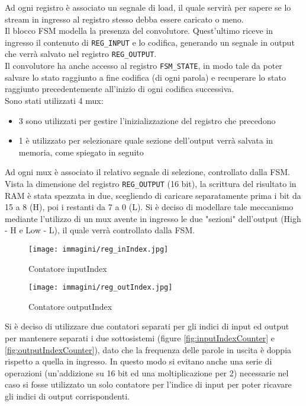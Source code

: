 \documentclass{article}
\begin{document}
Ad ogni registro è associato un segnale di load, il quale servirà per sapere se lo stream in ingresso al registro stesso debba essere caricato o meno.
\\
Il blocco FSM modella la presenza del convolutore. Quest'ultimo riceve in ingresso il contenuto di \texttt{REG\_INPUT} e lo codifica, generando un segnale in output che verrà salvato nel registro \texttt{REG\_OUTPUT}. 
\\
Il convolutore ha anche accesso al registro \texttt{FSM\_STATE}, in modo tale da poter salvare lo stato raggiunto a fine codifica (di ogni parola) e recuperare lo stato raggiunto precedentemente all'inizio di ogni codifica successiva.
\\
Sono stati utilizzati 4 mux: 
\begin{itemize}
    \item 3 sono utilizzati per gestire l'inizializzazione del registro che precedono
    \item 1 è utilizzato per selezionare quale sezione dell'output verrà salvata in memoria, come spiegato in seguito
\end{itemize}
Ad ogni mux è associato il relativo segnale di selezione, controllato dalla FSM.
\\
Vista la dimensione del registro \texttt{REG\_OUTPUT} (16 bit), la scrittura del risultato in RAM è stata spezzata in due, scegliendo di caricare separatamente prima i bit da 15 a 8 (H), poi i restanti da 7 a 0 (L). Si è deciso di modellare tale meccanismo mediante l'utilizzo di un mux avente in ingresso le due "sezioni" dell'output (High - H e Low - L), il quale verrà controllato dalla FSM.\\

\begin{figure}[h]
    \centering
    \begin{minipage}{0.53\textwidth}
        \centering
        \texttt{[image: immagini/reg\_inIndex.jpg]}
        \caption{Contatore inputIndex}
        \label{fig:inputIndexCounter}
    \end{minipage}%
    \begin{minipage}{0.47\textwidth}
        \centering
        \texttt{[image: immagini/reg\_outIndex.jpg]}
        \caption{Contatore outputIndex}
        \label{fig:outputIndexCounter}
    \end{minipage}
    \label{fig:my_label}
\end{figure}

Si è deciso di utilizzare due contatori separati per gli indici di input ed output per mantenere separati i due sottosistemi (figure \ref{fig:inputIndexCounter} e \ref{fig:outputIndexCounter}), dato che la frequenza delle parole in uscita è doppia rispetto a quella in ingresso. In questo modo si evitano anche una serie di operazioni (un'addizione su 16 bit ed una moltiplicazione per 2) necessarie nel caso si fosse utilizzato un solo contatore per l'indice di input per poter ricavare gli indici di output corrispondenti.
\end{document}
